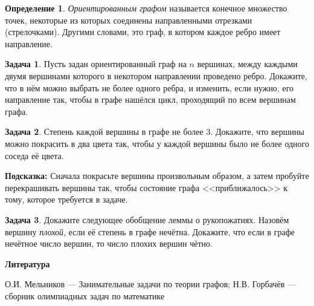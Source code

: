 \documentclass{article}
\theoremstyle{definition}
\newtheorem{problem}{Задача}
\newtheorem*{definition}{Определение}
\begin{document}
\begin{definition}
	\textit{Ориентированным графом} называется конечное множество точек, 
	некоторые из которых соединены направленными отрезками (стрелочками). 
	Другими словами, это граф, в котором каждое ребро имеет направление.
\end{definition}

\begin{problem}
	Пусть задан ориентированный граф на \( n \) вершинах, между каждыми двумя 
	вершинами которого в некотором направлении проведено ребро. Докажите, что в 
	нём можно выбрать не более одного ребра, и изменить, если нужно, его 
	направление так, чтобы в графе нашёлся цикл, проходящий по всем вершинам 
	графа.
\end{problem}

\begin{problem}
	Степень каждой вершины в графе не более 3. Докажите, что вершины можно 
	покрасить в два цвета так, чтобы у каждой вершины было не более одного 
	соседа её цвета.
	
	\textbf{Подсказка:} Сначала покрасьте вершины произвольным образом, а затем 
	пробуйте перекрашивать вершины так, чтобы состояние графа <<приближалось>> 
	к тому, которое требуется в задаче.
\end{problem}

\begin{problem}
	Докажите следующее обобщение леммы о рукопожатиях. Назовём вершину 
	\textit{плохой}, если её степень в графе нечётна. Докажите, что если в 
	графе нечётное число вершин, то число плохих вершин чётно.
\end{problem}


\footnotesize

\textbf{Литература}

О.И. Мельников --- Занимательные задачи по теории графов; Н.В. Горбачёв --- 
сборник олимпиадных задач по математике


    
\end{document}
